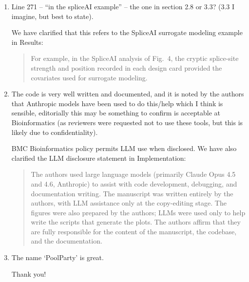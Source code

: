 \documentclass[11pt]{article}
\newenvironment{response}{\par\color{responseblue}}{\par}
\newenvironment{msquote}
  {\begin{quote}\color{quotedtext}\noindent\ignorespaces}
  {\end{quote}}
\begin{document}
\begin{enumerate}
\item Line 271 -- ``in the spliceAI example'' -- the one in section 2.8 or 3.3?
(3.3 I imagine, but best to state).

\begin{response}
We have clarified that this refers to the SpliceAI surrogate modeling example in Results:

\begin{msquote}
For example, in the SpliceAI analysis of Fig.~4, the cryptic splice-site strength and position recorded in each design card provided the covariates used for surrogate modeling.
\end{msquote}
\end{response}

\item The code is very well written and documented, and it is noted by the
authors that Anthropic models have been used to do this/help which I think is
sensible, editorially this may be something to confirm is acceptable at
Bioinformatics (as reviewers were requested not to use these tools, but this is
likely due to confidentiality).

\begin{response}
BMC Bioinformatics policy permits LLM use when disclosed. We have also clarified the LLM disclosure statement in Implementation:

\begin{msquote}
The authors used large language models (primarily Claude Opus 4.5 and 4.6, Anthropic) to assist with code development, debugging, and documentation writing. The manuscript was written entirely by the authors, with LLM assistance only at the copy-editing stage. The figures were also prepared by the authors; LLMs were used only to help write the scripts that generate the plots. The authors affirm that they are fully responsible for the content of the manuscript, the codebase, and the documentation. 
\end{msquote}
\end{response}

\item The name `PoolParty' is great.

\begin{response}
Thank you!
\end{response}
\end{enumerate}

{}


\end{document}
